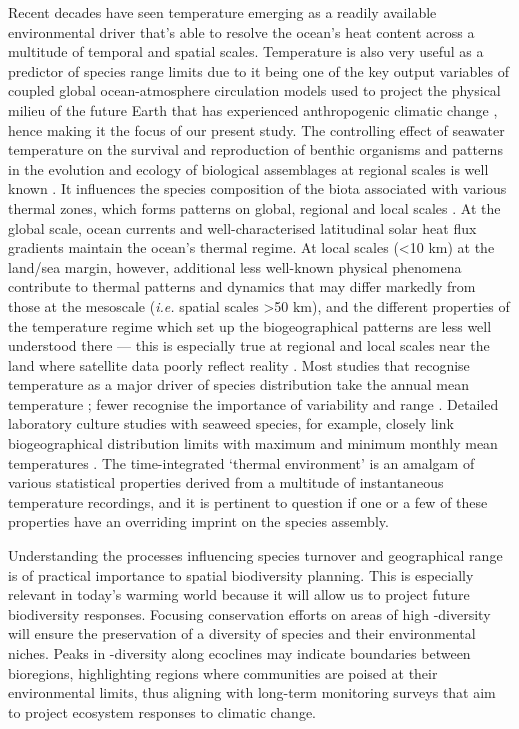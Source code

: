 \documentclass[utf8]{frontiersSCNS} %
\begin{document}
Recent decades have seen temperature emerging as a readily available environmental driver that's able to resolve the ocean's heat content across a multitude of temporal and spatial scales. Temperature is also very useful as a predictor of species range limits due to it being one of the key output variables of coupled global ocean-atmosphere circulation models used to project the physical milieu of the future Earth that has experienced anthropogenic climatic change \citep{AR5}, hence making it the focus of our present study. The controlling effect of seawater temperature on the survival and reproduction of benthic organisms and patterns in the evolution and ecology of biological assemblages at regional scales is well known \citep{VandenHoek1982,Breeman1988,Blanchet2008,Broitman2008,Byrne2009,Verbruggen2009,Wieters2009,Couce2012,Potts2014}. It influences the species composition of the biota associated with various thermal zones, which forms patterns on global, regional and local scales \citep{Tittensor2010,Spalding2012}. At the global scale, ocean currents and well-characterised latitudinal solar heat flux gradients maintain the ocean's thermal regime. At local scales (\textless{}10 km) at the land/sea margin, however, additional less well-known physical phenomena contribute to thermal patterns and dynamics that may differ markedly from those at the mesoscale (\emph{i.e.} spatial scales \textgreater{}50 km), and the different properties of the temperature regime which set up the biogeographical patterns are less well understood there --- this is especially true at regional and local scales near the land where satellite data poorly reflect reality \citep{Smit2013}. Most studies that recognise temperature as a major driver of species distribution take the annual mean temperature \citep{Tittensor2010}; fewer recognise the importance of variability and range
\citep[\emph{e.g.}][]{Couce2012,Tyberghein2012}. Detailed laboratory culture studies with seaweed species, for example, closely link biogeographical distribution limits with maximum and minimum monthly mean temperatures \citep{VandenHoek1982,Breeman1988}. The time-integrated `thermal environment' is an amalgam of various statistical properties derived from a multitude of instantaneous temperature recordings, and it is pertinent to question if one or a few of these properties have an overriding imprint on the species assembly.

Understanding the processes influencing species turnover and geographical range is of practical importance to spatial biodiversity planning. This is especially relevant in today's warming world because it will allow us to project future biodiversity responses. Focusing conservation efforts on areas of high \textbeta-diversity will ensure the preservation of a diversity of species and their environmental niches. Peaks in \textbeta-diversity along ecoclines may indicate boundaries between bioregions, highlighting regions where communities are poised at their environmental limits, thus aligning with long-term monitoring surveys that aim to project ecosystem responses to climatic change.
\end{document}

